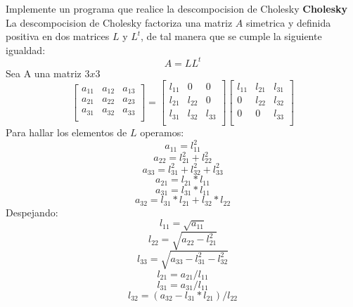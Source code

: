 \documentclass[12pt]{article}
\begin{document}
Implemente un programa que realice la descompocision de Cholesky
\textbf{Cholesky}
La descompocision de Cholesky factoriza una matriz $A$ simetrica y definida positiva en dos matrices $L$ y $L^t$, de tal manera que se cumple la siguiente igualdad:
$$A=LL^t$$
Sea A una matriz $3x3$
$$
\begin{bmatrix}
    a_{11} & a_{12} & a_{13}\\
    a_{21} & a_{22} & a_{23}\\
    a_{31} & a_{32} & a_{33}\\
\end{bmatrix}
= \begin{bmatrix}
    l_{11} & 0 & 0\\
    l_{21} & l_{22} & 0\\
    l_{31} & l_{32} & l_{33}\\
\end{bmatrix}
\begin{bmatrix}
    l_{11} & l_{21} & l_{31}\\
    0 & l_{22} & l_{32}\\
    0& 0 & l_{33}\\
\end{bmatrix}
$$
Para hallar los elementos de $L$ operamos:
$$a_{11} = l_{11}^2$$
$$a_{22} = l_{21}^2+l_{22}^2$$
$$a_{33} = l_{31}^2+l_{32}^2+l_{33}^2$$
$$a_{21} = l_{21}*l_{11}$$
$$a_{31} = l_{31}*l_{11}$$
$$a_{32} = l_{31}*l_{21} + l_{32}*l_{22}$$
Despejando:
$$l_{11} = \sqrt{a_{11}}$$
$$l_{22} = \sqrt{a_{22} - l_{21}^2 }$$
$$l_{33} = \sqrt{a_{33}-l_{31}^2-l_{32}^2}$$
$$l_{21} = a_{21}/l_{11}  $$
$$l_{31} = a_{31}/l_{11}$$
$$ l_{32} = (a_{32}-l_{31}*l_{21})/l_{22}$$
\end{document}
